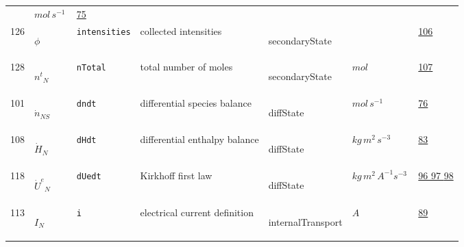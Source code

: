 \begin{longtable}{|p{1cm}|p{2.5cm}|p{4.5cm}|p{8cm}|p{3.0cm}|p{3cm}|p{1cm}|}
             & $ mol \,s^{-1} \, $
             & \hyperlink{"e:75"}{ 75 }
                 \\
    126
             & \hypertarget{"v:126"}{ $ {\phi}{_{}} $}
             & \verb|intensities|
             & collected intensities
             & \begin{lay}secondaryState \end{lay}
             & $  $
             & \hyperlink{"e:106"}{ 106 }
                 \\
    128
             & \hypertarget{"v:128"}{ $ {{n^t}}{_{N}} $}
             & \verb|nTotal|
             & total number of moles
             & \begin{lay}secondaryState \end{lay}
             & $ mol \, $
             & \hyperlink{"e:107"}{ 107 }
                 \\
    101
             & \hypertarget{"v:101"}{ $ {\dot{n}}{_{{N S}}} $}
             & \verb|dndt|
             & differential species balance
             & \begin{lay}diffState \end{lay}
             & $ mol \,s^{-1} \, $
             & \hyperlink{"e:76"}{ 76 }
                 \\
    108
             & \hypertarget{"v:108"}{ $ {{\dot{H}}}{_{N}} $}
             & \verb|dHdt|
             & differential enthalpy balance
             & \begin{lay}diffState \end{lay}
             & $ kg \,m^{2} \,s^{-3} \, $
             & \hyperlink{"e:83"}{ 83 }
                 \\
    118
             & \hypertarget{"v:118"}{ $ {{\dot{U}^e}}{_{N}} $}
             & \verb|dUedt|
             & Kirkhoff first law
             & \begin{lay}diffState \end{lay}
             & $ kg \,m^{2} \,A^{-1} s^{-3} \, $
             & \hyperlink{"e:96"}{ 96 }
                 \hyperlink{"e:97"}{ 97 }
                 \hyperlink{"e:98"}{ 98 }
                 \\
    113
             & \hypertarget{"v:113"}{ $ {I}{_{N}} $}
             & \verb|i|
             & electrical current definition
             & \begin{lay}internalTransport \end{lay}
             & $ A \, $
             & \hyperlink{"e:89"}{ 89 }
                 \\
    \end{longtable}